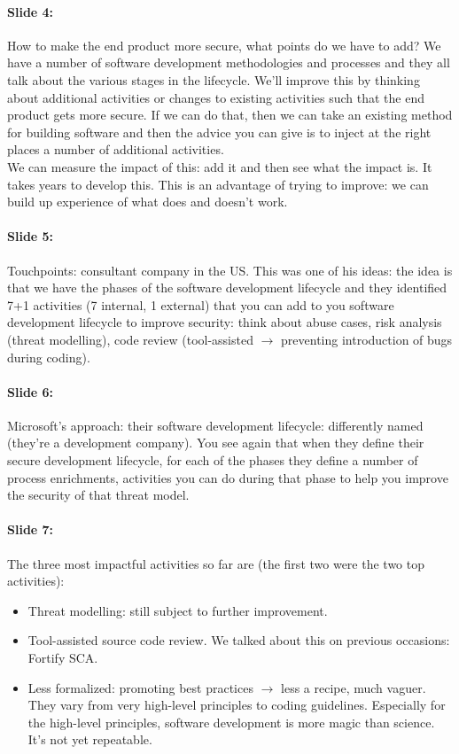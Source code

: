 \documentclass[10pt,a4paper]{report}
\begin{document}
\paragraph{Slide 4:} How to make the end product more secure, what points do we have to add? We have a number of software development methodologies and processes and they all talk about the various stages in the lifecycle. We'll improve this by thinking about additional activities or changes to existing activities such that the end product gets more secure. If we can do that, then we can take an existing method for building software and then the advice you can give is to inject at the right places a number of additional activities. \\
We can measure the impact of this: add it and then see what the impact is. It takes years to develop this. This is an advantage of trying to improve: we can build up experience of what does and doesn't work.

\paragraph{Slide 5:} Touchpoints: consultant company in the US. This was one of his ideas: the idea is that we have the phases of the software development lifecycle and they identified 7+1 activities (7 internal, 1 external) that you can add to you software development lifecycle to improve security: think about abuse cases, risk analysis (threat modelling), code review (tool-assisted $\rightarrow$ preventing introduction of bugs during coding). 

\paragraph{Slide 6:} Microsoft's approach: their software development lifecycle: differently named (they're a development company). You see again that when they define their secure development lifecycle, for each of the phases they define a number of process enrichments, activities you can do during that phase to help you improve the security of that threat model. 

\paragraph{Slide 7:} The three most impactful activities so far are (the first two were the two top activities):
\begin{itemize}
\item Threat modelling: still subject to further improvement.
\item Tool-assisted source code review. We talked about this on previous occasions: Fortify SCA.
\item Less formalized: promoting best practices $\rightarrow$ less a recipe, much vaguer. They vary from very high-level principles to coding guidelines. Especially for the high-level principles, software development is more magic than science. It's not yet repeatable. 
\end{itemize}
\end{document}
